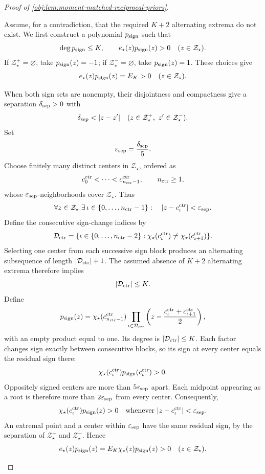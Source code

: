 \documentclass[11pt]{article}
\begin{document}
\begin{proof}[Proof of \cref{obj:lem:moment-matched-reciprocal-priors}]
\begin{enumerate}
Assume, for a contradiction, that the required \(K+2\) alternating extrema do not exist. We first construct a polynomial \(p_{\rm sign}\) such that
\[
\deg p_{\rm sign}\le K,\qquad
e_\star(z)p_{\rm sign}(z)>0
\quad(z\in\mathcal Z_\star).
\]
If \(\mathcal Z_\star^+=\varnothing\), take \(p_{\rm sign}(z)=-1\); if \(\mathcal Z_\star^-=\varnothing\), take \(p_{\rm sign}(z)=1\). These choices give
\[
e_\star(z)p_{\rm sign}(z)=E_K>0
\quad(z\in\mathcal Z_\star).
\]

When both sign sets are nonempty, their disjointness and compactness give a separation \(\delta_{\rm sep}>0\) with
\[
\delta_{\rm sep}<|z-z'|
\quad(z\in\mathcal Z_\star^+,\ z'\in\mathcal Z_\star^-).
\]
Set
\[
\varepsilon_{\rm sep}=\frac{\delta_{\rm sep}}5.
\]
Choose finitely many distinct centers in \(\mathcal Z_\star\), ordered as
\[
c_0^{\rm ctr}<\cdots<c_{n_{\rm ctr}-1}^{\rm ctr},
\qquad n_{\rm ctr}\ge1,
\]
whose \(\varepsilon_{\rm sep}\)-neighborhoods cover \(\mathcal Z_\star\). Thus
\[
\forall z\in\mathcal Z_\star\ \exists\,\iota\in\{0,\ldots,n_{\rm ctr}-1\}:
\quad |z-c_\iota^{\rm ctr}|<\varepsilon_{\rm sep}.
\]
Define the consecutive sign-change indices by
\[
\mathcal D_{\rm ctr}
=\{\iota\in\{0,\ldots,n_{\rm ctr}-2\}:
  \chi_\star(c_\iota^{\rm ctr})
  \ne\chi_\star(c_{\iota+1}^{\rm ctr})\}.
\]
Selecting one center from each successive sign block produces an alternating subsequence of length \(|\mathcal D_{\rm ctr}|+1\). The assumed absence of \(K+2\) alternating extrema therefore implies
\[
|\mathcal D_{\rm ctr}|\le K.
\]
Define
\[
p_{\rm sign}(z)
=\chi_\star(c_{n_{\rm ctr}-1}^{\rm ctr})
 \prod_{\iota\in\mathcal D_{\rm ctr}}
 \left(z-\frac{c_\iota^{\rm ctr}+c_{\iota+1}^{\rm ctr}}2\right),
\]
with an empty product equal to one. Its degree is \(|\mathcal D_{\rm ctr}|\le K\). Each factor changes sign exactly between consecutive blocks, so its sign at every center equals the residual sign there:
\[
\chi_\star(c_\iota^{\rm ctr})p_{\rm sign}(c_\iota^{\rm ctr})>0.
\]
Oppositely signed centers are more than \(5\varepsilon_{\rm sep}\) apart. Each midpoint appearing as a root is therefore more than \(2\varepsilon_{\rm sep}\) from every center. Consequently,
\[
\chi_\star(c_\iota^{\rm ctr})p_{\rm sign}(z)>0
\quad\text{whenever }|z-c_\iota^{\rm ctr}|<\varepsilon_{\rm sep}.
\]
An extremal point and a center within \(\varepsilon_{\rm sep}\) have the same residual sign, by the separation of \(\mathcal Z_\star^+\) and \(\mathcal Z_\star^-\). Hence
\[
e_\star(z)p_{\rm sign}(z)
=E_K\chi_\star(z)p_{\rm sign}(z)>0
\quad(z\in\mathcal Z_\star).
\]


\end{enumerate}
\end{proof}
\end{document}
